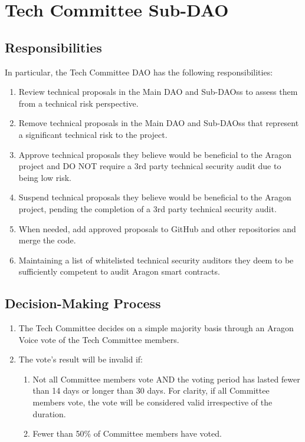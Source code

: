 \section{Tech Committee Sub-DAO}

\subsection{Responsibilities}		

In particular, the Tech Committee \ac{DAO} has the following responsibilities:
\begin{enumerate}		
	\item Review technical proposals in the Main \ac{DAO} and Sub-\acp{DAO}s to assess them from a technical risk perspective.
	\item Remove technical proposals in the Main \ac{DAO} and Sub-\acp{DAO}s that represent a significant technical risk to the project.
	\item Approve technical proposals they believe would be beneficial to the Aragon project and DO NOT require a 3rd party technical security audit due to being low risk.
	\item Suspend technical proposals they believe would be beneficial to the Aragon project, pending the completion of a 3rd party technical security audit.
	\item When needed, add approved proposals to GitHub and other repositories and merge the code.
	\item Maintaining a list of whitelisted technical security auditors they deem to be sufficiently competent to audit Aragon smart contracts.
\end{enumerate}



\subsection{Decision-Making Process}
\begin{enumerate}
	\item The Tech Committee decides on a simple majority basis through an Aragon Voice vote of the Tech Committee members.
	\item The vote’s result will be invalid if:
	\begin{enumerate}
		\item Not all Committee members vote AND the voting period has lasted
		fewer than 14 days or longer than 30 days.
		For clarity, if all Committee members vote, the vote will be considered valid irrespective of the duration.
		\item Fewer than 50\% of Committee members have voted.
	\end{enumerate}
\end{enumerate}


